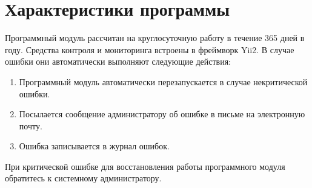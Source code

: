 \chapter{Характеристики программы}
\label{ch:characteristics}

Программный модуль рассчитан на круглосуточную работу в течение 365 дней в году.
Средства контроля и мониторинга встроены в фреймворк Yii2.
В случае ошибки они автоматически выполняют следующие действия:
\begin{enumerate}
  \item Программный модуль автоматически перезапускается в случае некритической ошибки.
  \item Посылается сообщение администратору об ошибке в письме на электронную почту.
  \item Ошибка записывается в журнал ошибок.
\end{enumerate}

При критической ошибке для восстановления работы программного модуля обратитесь к системному администратору.
